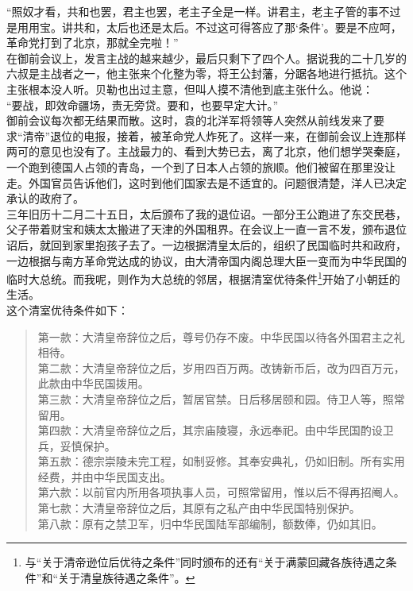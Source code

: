 “照奴才看，共和也罢，君主也罢，老主子全是一样。讲君主，老主子管的事不过是用用宝。讲共和，太后也还是太后。不过这可得答应了那‘条件’。要是不应呵，革命党打到了北京，那就全完啦！”\\

在御前会议上，发言主战的越来越少，最后只剩下了四个人。据说我的二十几岁的六叔是主战者之一，他主张来个化整为零，将王公封藩，分踞各地进行抵抗。这个主张根本没人听。贝勒也出过主意，但叫人摸不清他到底主张什么。他说：\\

“要战，即效命疆场，责无旁贷。要和，也要早定大计。”\\

御前会议每次都无结果而散。这时，袁的北洋军将领等人突然从前线发来了要求“清帝”退位的电报，接着，被革命党人炸死了。这样一来，在御前会议上连那样两可的意见也没有了。主战最力的、看到大势已去，离了北京，他们想学哭秦庭，一个跑到德国人占领的青岛，一个到了日本人占领的旅顺。他们被留在那里没让走。外国官员告诉他们，这时到他们国家去是不适宜的。问题很清楚，洋人已决定承认的政府了。\\

三年旧历十二月二十五日，太后颁布了我的退位诏。一部分王公跑进了东交民巷，父子带着财宝和姨太太搬进了天津的外国租界。在会议上一直一言不发，颁布退位诏后，就回到家里抱孩子去了。一边根据清皇太后的，组织了民国临时共和政府，一边根据与南方革命党达成的协议，由大清帝国内阁总理大臣一变而为中华民国的临时大总统。而我呢，则作为大总统的邻居，根据清室优待条件\footnote{与“关于清帝逊位后优待之条件”同时颁布的还有“关于满蒙回藏各族待遇之条件”和“关于清皇族待遇之条件”。}开始了小朝廷的生活。\\

这个清室优待条件如下：\\

\begin{quote}
	第一款：大清皇帝辞位之后，尊号仍存不废。中华民国以待各外国君主之礼相待。\\

第二款：大清皇帝辞位之后，岁用四百万两。改铸新币后，改为四百万元，此款由中华民国拨用。\\

第三款：大清皇帝辞位之后，暂居官禁。日后移居颐和园。侍卫人等，照常留用。\\

第四款：大清皇帝辞位之后，其宗庙陵寝，永远奉祀。由中华民国酌设卫兵，妥慎保护。\\

第五款：德宗崇陵未完工程，如制妥修。其奉安典礼，仍如旧制。所有实用经费，并由中华民国支出。\\

第六款：以前官内所用各项执事人员，可照常留用，惟以后不得再招阉人。\\

第七款：大清皇帝辞位之后，其原有之私产由中华民国特别保护。\\

第八款：原有之禁卫军，归中华民国陆军部编制，额数俸，仍如其旧。\\
\end{quote}
